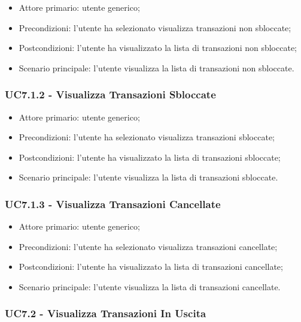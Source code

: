 \begin{itemize}
    \item Attore primario: utente generico;
    \item Precondizioni: l'utente ha selezionato visualizza transazioni non sbloccate;
    \item Postcondizioni: l'utente ha visualizzato la lista di transazioni non sbloccate;
    \item Scenario principale: l'utente visualizza la lista di transazioni non sbloccate.
\end{itemize}

\subsubsection{UC7.1.2 - Visualizza Transazioni Sbloccate}

\begin{itemize}
    \item Attore primario: utente generico;
    \item Precondizioni: l'utente ha selezionato visualizza transazioni sbloccate;
    \item Postcondizioni: l'utente ha visualizzato la lista di transazioni sbloccate;
    \item Scenario principale: l'utente visualizza la lista di transazioni sbloccate.
\end{itemize}

\subsubsection{UC7.1.3 - Visualizza Transazioni Cancellate}

\begin{itemize}
    \item Attore primario: utente generico;
    \item Precondizioni: l'utente ha selezionato visualizza transazioni cancellate;
    \item Postcondizioni: l'utente ha visualizzato la lista di transazioni cancellate;
    \item Scenario principale: l'utente visualizza la lista di transazioni cancellate.
\end{itemize}

\subsubsection{UC7.2 - Visualizza Transazioni In Uscita}

